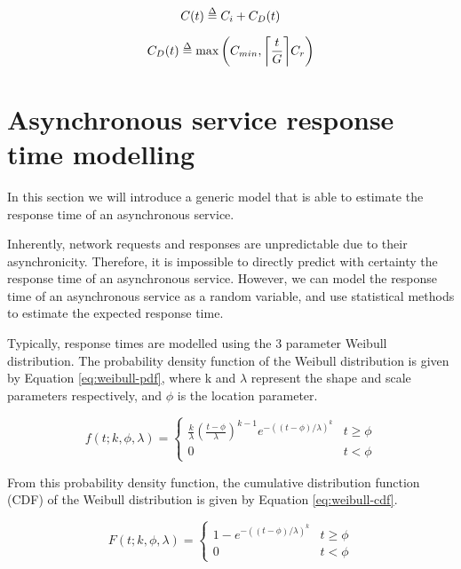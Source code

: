 \begin{equation} \label{eq:faas-billing-model}
C(t) \delequal C_i + C_D(t)
\end{equation}

\begin{equation}
C_D(t) \delequal \max\left(C_{min},\ceil*{\frac{t}{G}} C_r\right)
\end{equation}

\section{Asynchronous service response time modelling}
\label{sec:faas-async-service-response-time-modelling}
In this section we will introduce a generic model that is able to estimate the response time of an asynchronous service.

Inherently, network requests and responses are unpredictable due to their asynchronicity. Therefore, it is impossible to directly predict with certainty the response time of an asynchronous service. However, we can model the response time of an asynchronous service as a random variable, and use statistical methods to estimate the expected response time.

Typically, response times are modelled using the 3 parameter Weibull distribution\cite{rouderHierarchicalModelEstimating2005}. The probability density function of the Weibull distribution is given by Equation \ref{eq:weibull-pdf}, where k and $\lambda$ represent the shape and scale parameters respectively, and $\phi$ is the location parameter.

\begin{equation} \label{eq:weibull-pdf}
f(t; k, \phi, \lambda) =
\begin{cases}
\frac{k}{\lambda} \left(\frac{t - \phi}{\lambda}\right)^{k-1} e^{-((t - \phi)/\lambda)^k} & t \geq \phi \\
0 & t < \phi
\end{cases}
\end{equation}

From this probability density function, the cumulative distribution function (CDF) of the Weibull distribution is given by Equation \ref{eq:weibull-cdf}.

\begin{equation} \label{eq:weibull-cdf}
F(t; k, \phi, \lambda) =
\begin{cases}
1 - e^{-((t - \phi)/\lambda)^k} & t \geq \phi \\
0 & t < \phi
\end{cases}
\end{equation}

